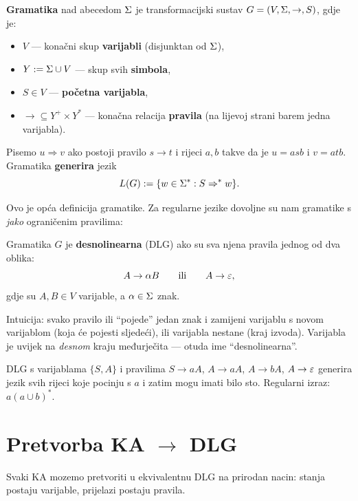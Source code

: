 \begin{definicija}[Gramatika]
\textbf{Gramatika} nad abecedom $\Sigma$ je transformacijski sustav
$G = (V, \Sigma, \to, S)$, gdje je:
\begin{itemize}
  \item $V$ --- konačni skup \textbf{varijabli} (disjunktan od $\Sigma$),
  \item $Y := \Sigma \cup V$ --- skup svih \textbf{simbola},
  \item $S \in V$ --- \textbf{početna varijabla},
  \item ${\to} \subseteq Y^+ \times Y^*$ --- konačna relacija
        \textbf{pravila} (na lijevoj strani barem jedna varijabla).
\end{itemize}
Pisemo $u \Rightarrow v$ ako postoji pravilo $s \to t$ i rijeci $a, b$
takve da je $u = asb$ i $v = atb$. Gramatika \textbf{generira} jezik
\[
  L(G) := \{w \in \Sigma^* : S \Rightarrow^* w\}.
\]
\end{definicija}

Ovo je opća definicija gramatike. Za regularne jezike dovoljne su nam
gramatike s \emph{jako} ograničenim pravilima:

\begin{definicija}
Gramatika $G$ je \textbf{desnolinearna} (DLG) ako su sva njena pravila
jednog od dva oblika:
\[
  A \to \alpha B \qquad \text{ili} \qquad A \to \varepsilon,
\]
gdje su $A, B \in V$ varijable, a $\alpha \in \Sigma$ znak.
\end{definicija}

Intuicija: svako pravilo ili ``pojede'' jedan znak i zamijeni varijablu
s novom varijablom (koja će pojesti sljedeći), ili varijabla nestane
(kraj izvoda). Varijabla je uvijek na \emph{desnom} kraju međurječita
--- otuda ime ``desnolinearna''.

\begin{primjer}
DLG s varijablama $\{S, A\}$ i pravilima
$S \to aA$, $A \to aA$, $A \to bA$, $A \to \varepsilon$
generira jezik svih rijeci koje pocinju s $a$ i zatim mogu imati bilo
sto. Regularni izraz: $a(a \cup b)^*$.
\end{primjer}

\section{Pretvorba KA $\to$ DLG}

Svaki KA mozemo pretvoriti u ekvivalentnu DLG na prirodan nacin:
stanja postaju varijable, prijelazi postaju pravila.

